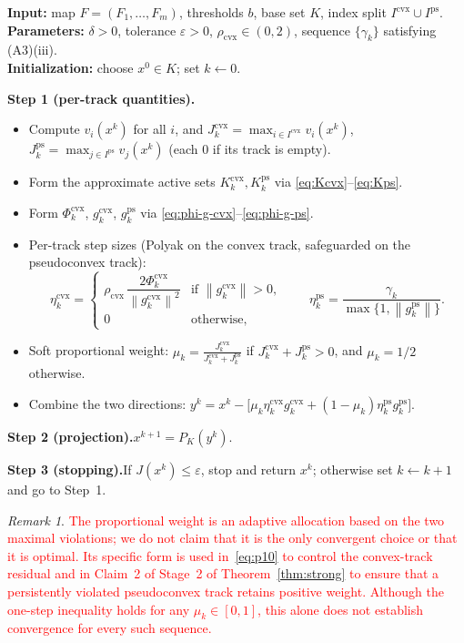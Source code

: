 \documentclass[]{interact}
\theoremstyle{plain}
\theoremstyle{definition}
\theoremstyle{remark}
\newtheorem{remark}{Remark}
\newcommand{\algstep}[1]{\smallskip\noindent\textbf{#1}}
\newcommand{\norm}[1]{\left\lVert #1 \right\rVert}
\newcommand{\cvx}{\mathrm{cvx}}
\newcommand{\ps}{\mathrm{ps}}
\begin{document}
\begin{algorithm}[H]
\caption{Dual-Track Adaptive Projection (DTAP) for the normal-box NSFP
\eqref{eq:nsfp-box}.}
\label{alg:dtap}
\small
\noindent\textbf{Input:} map $F=(F_1,\dots,F_m)$, thresholds $b$, base set $K$, index
split $I^{\cvx}\cup I^{\ps}$.\\
\textbf{Parameters:} $\delta>0$, tolerance $\varepsilon>0$, $\rho_{\cvx}\in(0,2)$,
sequence $\{\gamma_k\}$ satisfying (A3)(iii).\\
\textbf{Initialization:} choose $x^0\in K$; set $k\leftarrow 0$.

\algstep{Step 1 (per-track quantities).}
\begin{itemize}[leftmargin=1.6em,itemsep=1pt,topsep=2pt]
\item[(1a)] Compute $v_i(x^k)$ for all $i$, and $J^{\cvx}_k=\max_{i\in I^{\cvx}}v_i(x^k)$,
$J^{\ps}_k=\max_{j\in I^{\ps}}v_j(x^k)$ (each $0$ if its track is empty).
\item[(1b)] Form the approximate active sets $K^{\cvx}_k,K^{\ps}_k$ via
\eqref{eq:Kcvx}--\eqref{eq:Kps}.
\item[(1c)] Form $\Phi^{\cvx}_k$, $g^{\cvx}_k$, $g^{\ps}_k$ via
\eqref{eq:phi-g-cvx}--\eqref{eq:phi-g-ps}.
\item[(1d)] Per-track step sizes (Polyak on the convex track, safeguarded on the
pseudoconvex track):
\[
\eta^{\cvx}_k=\begin{cases}\rho_{\cvx}\,\dfrac{2\Phi^{\cvx}_k}{\norm{g^{\cvx}_k}^2} & \text{if }\norm{g^{\cvx}_k}>0,\\ 0 & \text{otherwise,}\end{cases}
\qquad
\eta^{\ps}_k=\frac{\gamma_k}{\max\{1,\norm{g^{\ps}_k}\}} .
\]
\item[(1e)] Soft proportional weight:
$\displaystyle \mu_k=\frac{J^{\cvx}_k}{J^{\cvx}_k+J^{\ps}_k}$ if
$J^{\cvx}_k+J^{\ps}_k>0$, and $\mu_k=1/2$ otherwise.
\item[(1f)] Combine the two directions:
$\displaystyle y^k=x^k-\bigl[\mu_k\eta^{\cvx}_k g^{\cvx}_k+(1-\mu_k)\eta^{\ps}_k g^{\ps}_k\bigr].$
\end{itemize}
\algstep{Step 2 (projection).}\quad $x^{k+1}=P_K(y^k)$.

\algstep{Step 3 (stopping).}\quad If $J(x^k)\le\varepsilon$, stop and return $x^k$;
otherwise set $k\leftarrow k+1$ and go to Step~1.
\end{algorithm}

\begin{remark}\label{rem:weight-scope}
\leavevmode\textcolor{red}{The proportional weight is an adaptive allocation based on the two maximal violations;
we do not claim that it is the only convergent choice or that it is optimal.
Its specific form is used in~\eqref{eq:p10} to control the convex-track residual and in
Claim~2 of Stage~2 of Theorem~\ref{thm:strong} to ensure that a persistently violated
pseudoconvex track retains positive weight. Although the one-step inequality holds for
any $\mu_k\in[0,1]$, this alone does not establish convergence for every such sequence.}
\end{remark}
\end{document}
